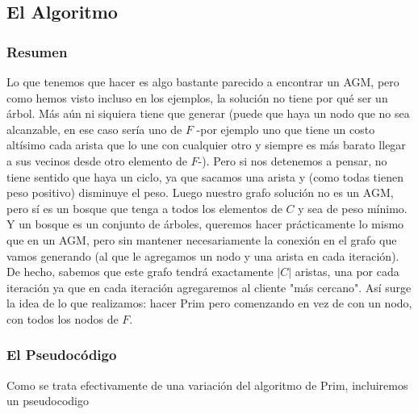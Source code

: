 \documentclass[A4paper,oneside,fleqn,11pt]{article}
\theoremstyle{definition}
\begin{document}
\subsection{El Algoritmo}

\subsubsection{Resumen}
Lo que tenemos que hacer es algo bastante parecido a encontrar un AGM, pero como hemos visto incluso en los ejemplos, la solución no tiene por qué ser un \'arbol. Más aún ni siquiera tiene que generar (puede que haya un nodo que no sea alcanzable, en ese caso sería uno de $F$ -por ejemplo uno que tiene un costo altísimo cada arista que lo une con cualquier otro y siempre es más barato llegar a sus vecinos desde otro elemento de $F$-). Pero si nos detenemos a pensar, no tiene sentido que haya un ciclo, ya que sacamos una arista y (como todas tienen peso positivo) disminuye el peso. Luego nuestro grafo soluci\'on no es un AGM, pero s\'i es un bosque que tenga a todos los elementos de $C$ y sea de peso mínimo. Y un bosque es un conjunto de \'arboles, queremos hacer pr\'acticamente lo mismo que en un AGM, pero sin mantener necesariamente la conexión en el grafo que vamos generando (al que le agregamos un nodo y una arista en cada iteración). De hecho, sabemos que este grafo tendrá exactamente $|C|$ aristas, una por cada iteración ya que en cada iteración agregaremos al cliente "más cercano". Así surge la idea de lo que realizamos: hacer Prim pero comenzando en vez de con un nodo, con todos los nodos de $F$.
\subsubsection{El Pseudocódigo}
 Como se trata efectivamente de una variación del algoritmo de Prim, incluiremos un pseudocodigo
\end{document}
